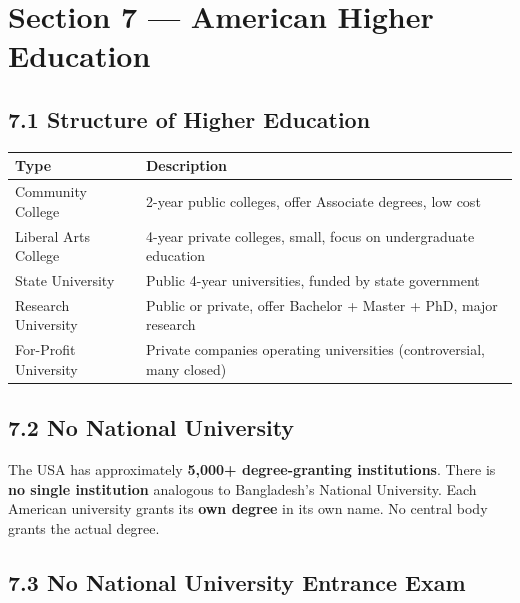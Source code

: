 	\section{Section 7 --- American Higher Education}

	\subsection{7.1 Structure of Higher Education}


\begin{center}\small
	\begin{tabularx}{0.97\textwidth}{@{} >{\raggedright\arraybackslash}p{3.5cm} X @{}}
		\toprule
		\textbf{Type}         & \textbf{Description}                                                  \\
		\midrule
		Community College     & 2-year public colleges, offer Associate degrees, low cost             \\
		Liberal Arts College  & 4-year private colleges, small, focus on undergraduate education      \\
		State University      & Public 4-year universities, funded by state government                \\
		Research University   & Public or private, offer Bachelor + Master + PhD, major research      \\
		For-Profit University & Private companies operating universities (controversial, many closed) \\
		\bottomrule
	\end{tabularx}
\end{center}


	\subsection{7.2 No National University}

	The USA has approximately \textbf{5,000+ degree-granting institutions}. There is \textbf{no single institution} analogous to Bangladesh's National University. Each American university grants its \textbf{own degree} in its own name. No central body grants the actual degree.

	\subsection{7.3 No National University Entrance Exam}

